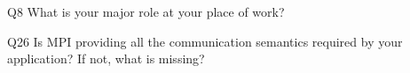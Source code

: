 \begin{description}%
\item{Q8} What is your major role at your place of work?%
\item{Q26} Is MPI providing all the communication semantics required by your application? If not, what is missing?%
\end{description}%
